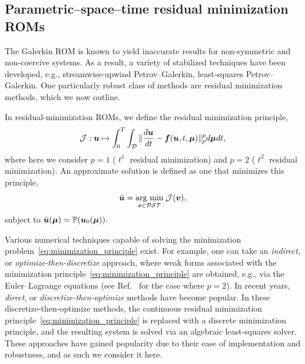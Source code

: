 \documentclass[3p,computermodern,10pt]{elsarticle}
\begin{document}
\subsection{Parametric--space--time residual minimization ROMs}
The Galerkin ROM is known to yield inaccurate results for non-symmetric and non-coercive systems. As a result, a variety of stabilized techniques have been developed, e.g., streamwise-upwind Petrov--Galerkin, least-squares Petrov--Galerkin. One particularly robust class of methods are residual minimization methods, which we now outline. 

In residual-minimization ROMs, we define the residual minimization principle,
\begin{equation}\label{eq:minimization_principle}
\mathcal{J} : \boldsymbol u \mapsto \int_{0}^T \int_{\mathcal{D}} \| \frac{d \boldsymbol u}{dt} - \boldsymbol f(\boldsymbol u,t,\boldsymbol \mu) \|_{p}^p d\boldsymbol \mu dt,
\end{equation}
where here we consider $p=1$ ($\ell^1$ residual minimization) and $p=2$ ($\ell^2$ residual minimization).
An approximate solution is defined as one that minimizes this principle, 
\begin{equation}\label{eq:minimization_problem}
\tilde{\boldsymbol u} = \underset{ \boldsymbol v \in \mathcal{PST}}{\text{arg min}}\;\mathcal{J}(\boldsymbol v),
\end{equation}
subject to $\tilde{\boldsymbol u}(\boldsymbol \mu) = \mathbb{P}(\boldsymbol u_0(\boldsymbol \mu)).$ 

Various numerical techniques capable of solving the minimization problem~\eqref{eq:minimization_principle} exist. For example, one can take an \textit{indirect}, or \textit{optimize-then-discretize} approach, where weak forms associated with the minimization principle~\eqref{eq:minimization_principle} are obtained, e.g., via the Euler--Lagrange equations (see Ref.~\cite{parish_wls} for the case where $p=2$). In recent years, \textit{direct}, or \textit{discretize-then-optimize} methods have become popular. In these discretize-then-optimize methods, the continuous residual minimization principle~\eqref{eq:minimization_principle} is replaced with a discrete minimization principle, and the resulting system is solved via an algebraic least-squares solver. These approaches have gained popularity due to their ease of implementation and robustness, and as such we consider it here. 
\end{document}
